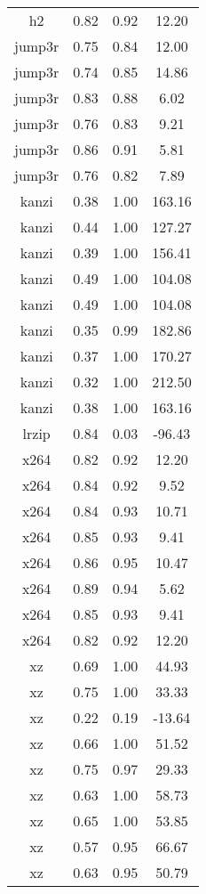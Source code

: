 \begin{table}[h]
\begin{tabular}{|c|c|c|c|}
        h2 & 0.82 & 0.92 & 12.20 \\
        jump3r & 0.75 & 0.84 & 12.00 \\
        jump3r & 0.74 & 0.85 & 14.86 \\
        jump3r & 0.83 & 0.88 & 6.02 \\
        jump3r & 0.76 & 0.83 & 9.21 \\
        jump3r & 0.86 & 0.91 & 5.81 \\
        jump3r & 0.76 & 0.82 & 7.89 \\
        kanzi & 0.38 & 1.00 & 163.16 \\
        kanzi & 0.44 & 1.00 & 127.27 \\
        kanzi & 0.39 & 1.00 & 156.41 \\
        kanzi & 0.49 & 1.00 & 104.08 \\
        kanzi & 0.49 & 1.00 & 104.08 \\
        kanzi & 0.35 & 0.99 & 182.86 \\
        kanzi & 0.37 & 1.00 & 170.27 \\
        kanzi & 0.32 & 1.00 & 212.50 \\
        kanzi & 0.38 & 1.00 & 163.16 \\
        lrzip & 0.84 & 0.03 & -96.43 \\
        x264 & 0.82 & 0.92 & 12.20 \\
        x264 & 0.84 & 0.92 & 9.52 \\
        x264 & 0.84 & 0.93 & 10.71 \\
        x264 & 0.85 & 0.93 & 9.41 \\
        x264 & 0.86 & 0.95 & 10.47 \\
        x264 & 0.89 & 0.94 & 5.62 \\
        x264 & 0.85 & 0.93 & 9.41 \\
        x264 & 0.82 & 0.92 & 12.20 \\
        xz & 0.69 & 1.00 & 44.93 \\
        xz & 0.75 & 1.00 & 33.33 \\
        xz & 0.22 & 0.19 & -13.64 \\
        xz & 0.66 & 1.00 & 51.52 \\
        xz & 0.75 & 0.97 & 29.33 \\
        xz & 0.63 & 1.00 & 58.73 \\
        xz & 0.65 & 1.00 & 53.85 \\
        xz & 0.57 & 0.95 & 66.67 \\
        xz & 0.63 & 0.95 & 50.79 \\

\end{tabular}
\end{table}
